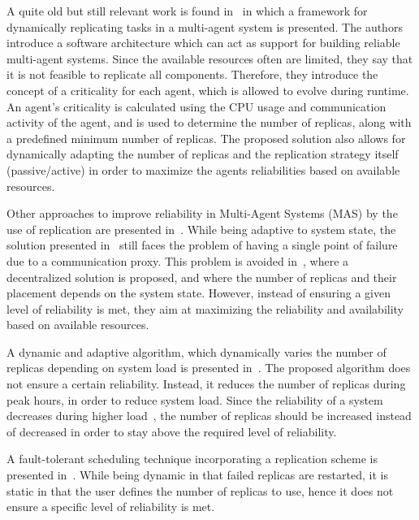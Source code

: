 \documentclass{cslthse-msc}
\begin{document}
A quite old but still relevant work is found in~\cite{dynAdaptRepl} in which a framework for dynamically replicating tasks in a multi-agent system is presented. The authors introduce a software architecture which can act as support for building reliable multi-agent systems. Since the available resources often are limited, they say that it is not feasible to replicate all components. Therefore, they introduce the concept of a criticality for each agent, which is allowed to evolve during runtime. An agent's criticality is calculated using the CPU usage and communication activity of the agent, and is used to determine the number of replicas, along with a predefined minimum number of replicas. The proposed solution also allows for dynamically adapting the number of replicas and the replication strategy itself (passive/active) in order to maximize the agents reliabilities based on available resources. 

Other approaches to improve reliability in Multi-Agent Systems (MAS) by the use of replication are presented in~\cite{replicatingAgents, adaptiveMASReplication, adaptiveAgentReplication}. While being adaptive to system state, the solution presented in~\cite{replicatingAgents} still faces the problem of having a single point of failure due to a communication proxy. This problem is avoided in~\cite{adaptiveMASReplication}, where a decentralized solution is proposed, and where the number of replicas and their placement depends on the system state. However, instead of ensuring a given level of reliability is met, they aim at maximizing the reliability and availability based on available resources. %

A dynamic and adaptive algorithm, which dynamically varies the number of replicas depending on system load is presented in~\cite{adaptiveCheckPointAndRep}. The proposed algorithm does not ensure a certain reliability. Instead, it reduces the number of replicas during peak hours, in order to reduce system load. Since the reliability of a system decreases during higher load~\cite{studyOfFailures, implicationsOfFailures}, the number of replicas should be increased instead of decreased in order to stay above the required level of reliability.

A fault-tolerant scheduling technique incorporating a replication scheme is presented in~\cite{faultTolerantSchedPolicy}. While being dynamic in that failed replicas are restarted, it is static in that the user defines the number of replicas to use, hence it does not ensure a specific level of reliability is met.
\end{document}
